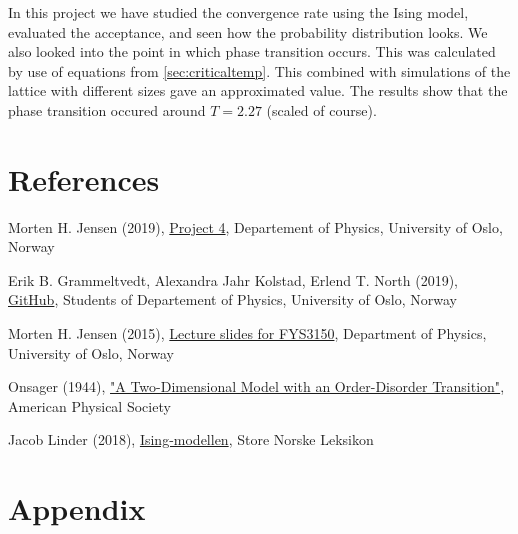 \documentclass{article}
\begin{document}
In this project we have studied the convergence rate using the Ising model, evaluated the acceptance, and seen how the probability distribution looks. We also looked into the point in which phase transition occurs. This was calculated by use of equations from \ref{sec:criticaltemp}. This combined with simulations of the lattice with different sizes gave an approximated value. The results show that the phase transition occured around $T=2.27$ (scaled of course).


\vspace{1cm}

\section{References} \label{sec:References}

\begin{thebibliography}{}

Morten H. Jensen (2019), \href{https://github.com/CompPhysics/ComputationalPhysics/blob/master/doc/Projects/2019/Project4/pdf/Project4.pdf}{Project 4}, Departement of Physics, University of Oslo, Norway

Erik B. Grammeltvedt, Alexandra Jahr Kolstad, Erlend T. North (2019), \href{https://github.com/Erikbgram/Fys3150}{GitHub}, Students of Departement of Physics, University of Oslo, Norway

Morten H. Jensen (2015), \href{https://github.com/CompPhysics/ComputationalPhysics/blob/master/doc/Lectures/lectures2015.pdf}{Lecture slides for FYS3150}, Department of Physics, University of Oslo, Norway

Onsager (1944), \href{https://journals.aps.org/pr/abstract/10.1103/PhysRev.65.117}{"A Two-Dimensional Model with an Order-Disorder Transition"}, American Physical Society

Jacob Linder (2018), \href{https://snl.no/Ising-modellen}{Ising-modellen}, Store Norske Leksikon \\

\end{thebibliography}


\vspace{1cm}


\appendix
\section{Appendix} \label{sec:Appendix}
\end{document}
